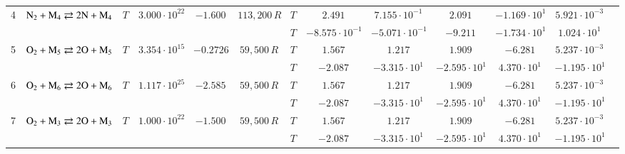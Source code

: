 \documentclass{warpdoc}
\begin{document}
\begin{table}[!ht]
\begin{center}
\begin{threeparttable}
\begin{tabular}{ccccccccccccc}
                                          
4 & $\rm N_2 + M_4 \rightleftarrows 2N+M_4$ &$T$ & $3.000 \cdot 10^{22}$ & $-1.600$ & $113,200\, R$ 
                                          &$T$  & $2.491$  & $7.155 \cdot 10^{-1}$  & $2.091$ & $-1.169 \cdot 10^{1}$ & $5.921 \cdot 10^{-3}$ & \multirow{2}{*}{\cite{jtht:1993:park,jtht:2001:park,ijhmt:2021:kim}} \\
 & & & & &                                &$T$  & $-8.575 \cdot 10^{-1}$  & $-5.071 \cdot 10^{-1}$  & $-9.211$ & $-1.734 \cdot 10^{1}$ & $1.024 \cdot 10^{1}$ & ~ \\                                          
                                          
                                          
5 & $\rm O_2 + M_5 \rightleftarrows 2O+M_5$ &$T$ & $3.354 \cdot 10^{15}$ & $-0.2726$ & $59,500\, R$ 
                                          &$T$  & $1.567$  & $1.217$  & $1.909$ & $-6.281$ & $5.237 \cdot 10^{-3}$ & \multirow{2}{*}{\cite{ijhmt:2020:kim,ijhmt:2021:kim}} \\
 & & & & &                                &$T$  & $-2.087$  & $-3.315 \cdot 10^{1}$  & $-2.595 \cdot 10^{1}$ & $4.370 \cdot 10^{1}$ & $-1.195 \cdot 10^{1}$ & ~ \\                                          
                                                                                   
6 & $\rm O_2 + M_6 \rightleftarrows 2O+M_6$ &$T$ & $1.117 \cdot 10^{25}$ & $-2.585$ & $59,500\, R$ 
                                          &$T$  & $1.567$  & $1.217$  & $1.909$ & $-6.281$ & $5.237 \cdot 10^{-3}$ & \multirow{2}{*}{\cite{ijhmt:2020:kim,ijhmt:2021:kim}} \\
 & & & & &                                &$T$  & $-2.087$  & $-3.315 \cdot 10^{1}$  & $-2.595 \cdot 10^{1}$ & $4.370 \cdot 10^{1}$ & $-1.195 \cdot 10^{1}$ & ~ \\                                          
                                                                                    
7 & $\rm O_2 + M_3 \rightleftarrows 2O+M_3$ &$T$ & $1.000 \cdot 10^{22}$ & $-1.500$ & $59,500\, R$ 
                                          &$T$  & $1.567$  & $1.217$  & $1.909$ & $-6.281$ & $5.237 \cdot 10^{-3}$ & \multirow{2}{*}{\cite{jtht:1993:park,jtht:2001:park,ijhmt:2021:kim}} \\
 & & & & &                                &$T$  & $-2.087$  & $-3.315 \cdot 10^{1}$  & $-2.595 \cdot 10^{1}$ & $4.370 \cdot 10^{1}$ & $-1.195 \cdot 10^{1}$ & ~ \\                                          
                                                                                   

\end{tabular}
\end{threeparttable}
\end{center}
\end{table}
\end{document}
